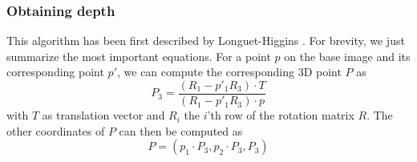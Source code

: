 \documentclass{paper}
\begin{document}
\subsubsection{Obtaining depth}
This algorithm has been first described by Longuet-Higgins \cite{Longuet-Higgins87}. For brevity, we just summarize the most important equations. For
a point $p$ on the base image and its corresponding point $p'$, we can compute the corresponding 3D point $P$ as
\begin{equation}
 P_3 = \frac{(R_1 - p'_1 R_3) \cdot T}{(R_1 - p'_1 R_3) \cdot p}
\end{equation}
with $T$ as translation vector and $R_i$ the $i$'th row of the rotation matrix $R$. The other coordinates of $P$ can then be computed as
\begin{equation}
 P = (p_1 \cdot P_3, p_2 \cdot P_3, P_3)
\end{equation}
\end{document}
